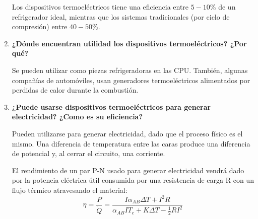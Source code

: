 \documentclass[a4paper,10pt,fleqn,oneside]{article}
\begin{document}
\begin{enumerate}[1.]
	Los dispositivos termoeléctricos tiene una eficiencia entre $5-10\%$ de un refrigerador ideal, mientras que los sistemas tradicionales (por ciclo de compresión) entre $40-50\%$.
	
	\item \textbf{¿Dónde encuentran utilidad los dispositivos termoeléctricos? ¿Por qué?}
	
	Se pueden utilizar como piezas refrigeradoras en las CPU. También, algunas compañías de automóviles,
usan generadores termoeléctricos alimentados por perdidas de calor durante la combustión.
	\item \textbf{¿Puede usarse dispositivos termoeléctricos para generar electricidad? ¿Como es su eficiencia?}
	
	Pueden utilizarse para generar electricidad, dado que el proceso físico es el mismo. Una diferencia de temperatura entre las caras produce una diferencia de potencial y, al cerrar el circuito, una corriente. 
	
	 El rendimiento de un par P-N usado para generar electricidad vendrá dado por la potencia eléctrica útil consumida por una resistencia de carga R con un flujo térmico atravesando el material: \[ \eta = \frac{P}{\dot{Q}} = \frac{I\alpha_{AB}\Delta T+I^2R}{\alpha_{AB}IT_c+K\Delta T-\frac{1}{2}RI^2} \] 
	
	
\end{enumerate}
\end{document}
